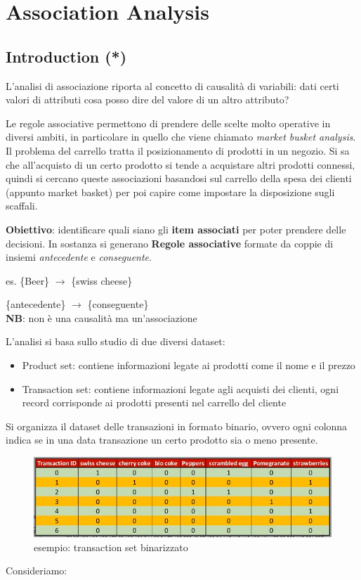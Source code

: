 \section{Association Analysis}
\subsection{Introduction (*)}

L'analisi di associazione riporta al concetto di causalità di variabili: dati certi valori di attributi cosa posso dire del valore di un altro attributo?

Le regole associative permettono di prendere delle scelte molto operative in diversi ambiti, in particolare in quello che viene chiamato \textit{market busket analysis}. 
Il problema del carrello tratta il posizionamento di prodotti in un negozio. Si sa che all'acquisto di un certo prodotto si tende a acquistare altri prodotti connessi, quindi si cercano queste associazioni basandosi sul carrello della spesa dei clienti (appunto market basket) per poi capire come impostare la disposizione sugli scaffali.

\textbf{Obiettivo}: identificare quali siano gli \textbf{item associati} per poter prendere delle decisioni. In sostanza si generano \textbf{Regole associative} formate da coppie di insiemi \textit{antecedente} e \textit{conseguente}.

es. \{Beer\} $\rightarrow$ \{swiss cheese\} 

\quad \{antecedente\} $\rightarrow$ \{conseguente\}\\
\textbf{NB}: non \`e una causalit\`a ma un'associazione

L'analisi si basa sullo studio di due diversi dataset:
\begin{itemize}
	\item Product set: contiene informazioni legate ai prodotti come il nome e il prezzo
	\item Transaction set: contiene informazioni legate agli acquisti dei clienti, ogni record corrisponde ai prodotti presenti nel carrello del cliente
\end{itemize}

Si organizza il dataset delle transazioni in formato binario, ovvero ogni colonna indica se in una data transazione un certo prodotto sia o meno presente.

\begin{figure}[H]
	\centering
	\includegraphics[height=0.25 \linewidth]{association/pict/transaction_set_bin.png}
	\caption{esempio: transaction set binarizzato}
\end{figure}
\clearpage
\noindent
Consideriamo:

